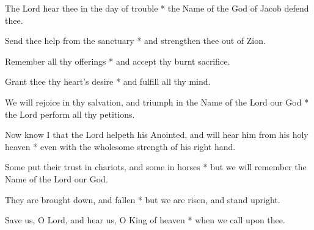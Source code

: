The Lord hear thee in the day of trouble * the Name of the God of Jacob defend thee.

Send thee help from the sanctuary * and strengthen thee out of Zion.

Remember all thy offerings * and accept thy burnt sacrifice.

Grant thee thy heart's desire * and fulfill all thy mind.

We will rejoice in thy salvation, and triumph in the Name of the Lord our God * the Lord perform all thy petitions.

Now know I that the Lord helpeth his Anointed, and will hear him from his holy heaven * even with the wholesome strength of his right hand.

Some put their trust in chariots, and some in horses * but we will remember the Name of the Lord our God.

They are brought down, and fallen * but we are risen, and stand upright.

Save us, O Lord, and hear us, O King of heaven * when we call upon thee.